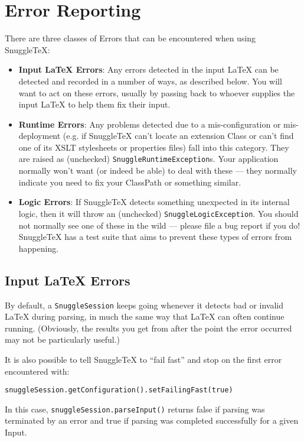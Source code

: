 
\section*{Error Reporting}

There are three classes of Errors that can be encountered when using SnuggleTeX:

\begin{itemize}

\item \textbf{Input LaTeX Errors}: Any errors detected in the input LaTeX can
  be detected and recorded in a number of ways, as described below. You will
  want to act on these errors, usually by passing back to whoever supplies
  the input LaTeX to help them fix their input.

\item \textbf{Runtime Errors}: Any problems detected due to a mis-configuration
  or mis-deployment (e.g. if SnuggleTeX can't locate an extension Class or can't
  find one of its XSLT stylesheets or properties files) fall into this category.
  They are raised as (unchecked) \verb|SnuggleRuntimeException|s. Your application
  normally won't want (or indeed be able) to deal with these --- they normally
  indicate you need to fix your ClassPath or something similar.

\item \textbf{Logic Errors}: If SnuggleTeX detects something unexpected in its
  internal logic, then it will throw an (unchecked) \verb|SnuggleLogicException|.
  You should not normally see one of these in the wild --- please file a bug report
  if you do! SnuggleTeX has a test suite that aims to prevent these types of errors
  from happening.
\end{itemize}

\subsection*{Input LaTeX Errors}

By default, a \verb|SnuggleSession| keeps going whenever it detects bad or
invalid LaTeX during parsing, in much the same way that LaTeX can often
continue running.
(Obviously, the results you get from after the point the error occurred
may not be particularly useful.)

It is also possible to tell SnuggleTeX to ``fail fast'' and stop on the first error
encountered with:
\begin{verbatim}snuggleSession.getConfiguration().setFailingFast(true)\end{verbatim}
In this case, \verb|snuggleSession.parseInput()| returns false if parsing was
terminated by an error and true if parsing was completed successfully for
a given Input.

